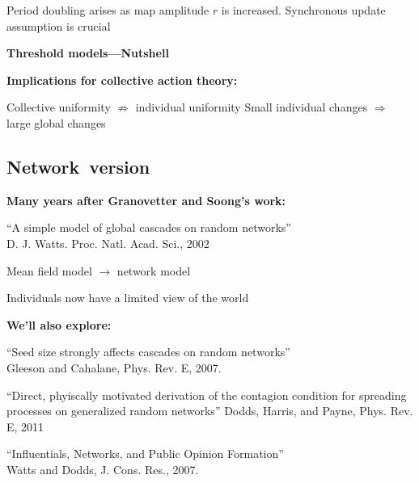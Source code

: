   
   Period doubling arises as map amplitude $r$ is increased.
   Synchronous update assumption is crucial
  
  

  


  \textbf{Threshold models---Nutshell}

  \textbf{Implications for collective action theory:}
    
     Collective uniformity $\not\Rightarrow$ individual uniformity
     Small individual changes $\Rightarrow$ large global changes
    
  










\subsection{Network\ version}


  \small
  \textbf{Many years after Granovetter and Soong's work:}
    
     
      ``A simple model of global cascades on random networks''\\      
      D. J. Watts.  Proc. Natl. Acad. Sci., 2002\cite{watts2002a}
      
       
        Mean field model $\rightarrow$ network model
       
        Individuals now have a limited view of the world
      
    
  

  \textbf{We'll also explore:}
    
     
      ``Seed size strongly affects cascades on random networks''\cite{gleeson2007a}\\
      Gleeson and Cahalane, Phys. Rev. E, 2007.
    
      ``Direct, phyiscally motivated derivation of the contagion condition for spreading processes on generalized random networks''\cite{dodds2011b}
      Dodds, Harris, and Payne, Phys. Rev. E, 2011
     
      ``Influentials, Networks, and Public Opinion Formation''\cite{watts2007a}\\
      Watts and Dodds, J. Cons. Res., 2007.
     
